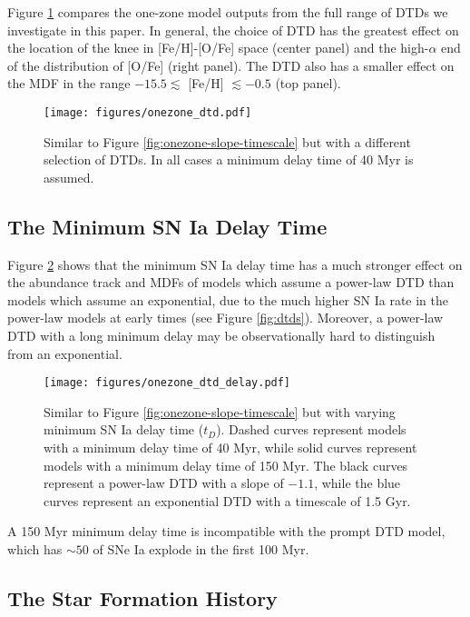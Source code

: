 \documentclass[twocolumn,linenumbers,twocolappendix]{aastex631}
\begin{document}
Figure \ref{fig:onezone-dtd} compares the one-zone model outputs from the full range of DTDs we investigate in this paper. In general, the choice of DTD has the greatest effect on the location of the knee in [Fe/H]-[O/Fe] space (center panel) and the high-$\alpha$ end of the distribution of [O/Fe] (right panel). The DTD also has a smaller effect on the MDF in the range $-15.5\lesssim$ [Fe/H] $\lesssim-0.5$ (top panel).

\begin{figure}
    \centering
    \texttt{[image: figures/onezone\_dtd.pdf]}
    \caption{Similar to Figure \ref{fig:onezone-slope-timescale} but with a different selection of DTDs. In all cases a minimum delay time of 40 Myr is assumed.}
    \label{fig:onezone-dtd}
\end{figure}

\subsection{The Minimum SN Ia Delay Time}

Figure \ref{fig:onezone-dtd-delay} shows that the minimum SN Ia delay time has a much stronger effect on the abundance track and MDFs of models which assume a power-law DTD than models which assume an exponential, due to the much higher SN Ia rate in the power-law models at early times (see Figure \ref{fig:dtds}). Moreover, a power-law DTD with a long minimum delay may be observationally hard to distinguish from an exponential. 

\begin{figure}
    \centering
    \texttt{[image: figures/onezone\_dtd\_delay.pdf]}
    \caption{Similar to Figure \ref{fig:onezone-slope-timescale} but with varying minimum SN Ia delay time ($t_D$). Dashed curves represent models with a minimum delay time of 40 Myr, while solid curves represent models with a minimum delay time of 150 Myr. The black curves represent a power-law DTD with a slope of $-1.1$, while the blue curves represent an exponential DTD with a timescale of 1.5 Gyr.}
    \label{fig:onezone-dtd-delay}
\end{figure}

A 150 Myr minimum delay time is incompatible with the prompt DTD model, which has $\sim 50$ of SNe Ia explode in the first 100 Myr.

\subsection{The Star Formation History}
\end{document}
